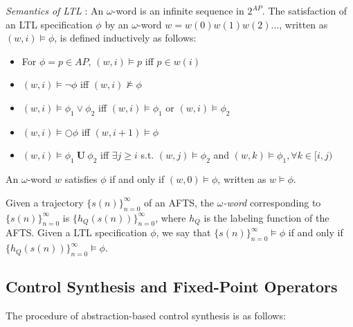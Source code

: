 {\color{teal}\emph{Semantics of LTL} \cite{Nilsson2017}:} An $\omega$-word is an infinite sequence in $ 2^{AP}$.  The satisfaction of an LTL specification $ \phi $ by an $\omega$-word $ w = w(0)w(1)w(2)\dots $, written as $ (w,i) \models \phi $, is defined inductively as follows:
\begin{itemize}
	\item For $ \phi = p \in AP $, $ (w,i)\models p $ iff $ p\in w(i) $ 
	\item $ (w,i)\models \neg \phi $ iff $ (w,i)\not\models \phi $
	\item $ (w,i)\models  \phi_1 \vee \phi_2 $ iff $ (w,i)\models \phi_1 $ or $ (w,i)\models \phi_2 $
	\item $ (w,i) \models \bigcirc \phi $ iff $ (w,i+1) \models \phi $
	\item $ (w,i)\models \phi_1 \mathbf{\ U\ } \phi_2 $ iff $\exists j\geq i  $ s.t. $ (w,j)\models \phi_2 $ and $ (w,k)\models \phi_1, \forall k\in [i,j) $
\end{itemize} 

An $\omega$-word $ w $ satisfies $ \phi $ if and only if $ (w,0)\models \phi $, written as $ w \models \phi $. 


{\color{purple} Given a trajectory $\{s(n)\}_{n=0}^{\infty} $ }
of an AFTS, the \textit{$\omega$-word} corresponding to {\color{purple} $\{s(n)\}_{n=0}^{\infty} $} is {\color{purple} $\{h_Q(s(n))\}_{n=0}^{\infty}$}, where $ h_Q $ is the labeling function of the AFTS.  Given a LTL specification $ \phi $, we say that {\color{purple} $\{s(n)\}_{n=0}^{\infty} \models \phi $} if and only if {\color{purple} $\{h_Q(s(n))\}_{n=0}^{\infty} \models \phi $}.

\subsection{Control Synthesis and Fixed-Point Operators}
\label{sec: cont_syn}
\iffalse
The procedure of abstraction-based control synthesis is as follows: 


